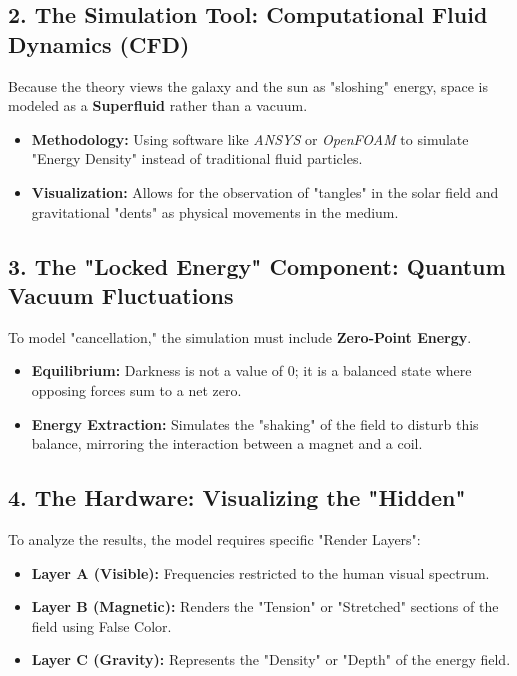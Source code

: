 \documentclass[11pt]{article}
\begin{document}
\subsection*{2. The Simulation Tool: Computational Fluid Dynamics (CFD)}
Because the theory views the galaxy and the sun as "sloshing" energy, space is modeled as a \textbf{Superfluid} rather than a vacuum.
\begin{itemize}
    \item \textbf{Methodology:} Using software like \textit{ANSYS} or \textit{OpenFOAM} to simulate "Energy Density" instead of traditional fluid particles.
    \item \textbf{Visualization:} Allows for the observation of "tangles" in the solar field and gravitational "dents" as physical movements in the medium.
\end{itemize}

\subsection*{3. The "Locked Energy" Component: Quantum Vacuum Fluctuations}
To model "cancellation," the simulation must include \textbf{Zero-Point Energy}.
\begin{itemize}
    \item \textbf{Equilibrium:} Darkness is not a value of $0$; it is a balanced state where opposing forces sum to a net zero.
    \item \textbf{Energy Extraction:} Simulates the "shaking" of the field to disturb this balance, mirroring the interaction between a magnet and a coil.
\end{itemize}

\subsection*{4. The Hardware: Visualizing the "Hidden"}
To analyze the results, the model requires specific "Render Layers":
\begin{itemize}
    \item \textbf{Layer A (Visible):} Frequencies restricted to the human visual spectrum.
    \item \textbf{Layer B (Magnetic):} Renders the "Tension" or "Stretched" sections of the field using False Color.
    \item \textbf{Layer C (Gravity):} Represents the "Density" or "Depth" of the energy field.
\end{itemize}
\end{document}
